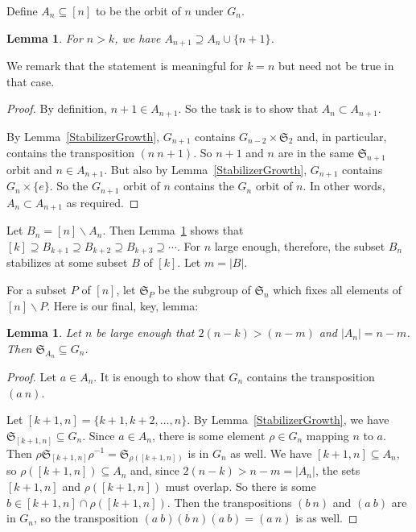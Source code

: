 \documentclass[10pt]{amsart}
\newcommand{\Sn}{\mathfrak{S}}
\newtheorem{lemma}[theorem]{Lemma}
\theoremstyle{definition}
\begin{document}
Define $A_n \subseteq [n]$ to be the orbit of $n$ under $G_n$. 

\begin{lemma} \label{AGrows}
For $n > k$, we have $A_{n+1} \supseteq A_n \cup \{ n+1 \}$.
\end{lemma}

We remark that the statement is meaningful for $k=n$ but need not be true in that case.

\begin{proof}
By definition, $n+1 \in A_{n+1}$. So the task is to show that $A_n \subset A_{n+1}$.

By Lemma~\ref{StabilizerGrowth}, $G_{n+1}$ contains $G_{n-2} \times \Sn_2$ and, in particular, contains the transposition $(n \ n+1)$. So $n+1$ and $n$ are in the same $\Sn_{n+1}$ orbit and $n \in A_{n+1}$. But also by Lemma~\ref{StabilizerGrowth}, $G_{n+1}$ contains $G_n \times \{ e \}$. So the $G_{n+1}$ orbit of $n$ contains the $G_n$ orbit of $n$. In other words, $A_n \subset A_{n+1}$ as required.
\end{proof}

Let $B_n = [n] \backslash A_n$. Then Lemma~\ref{AGrows} shows that $[k] \supseteq B_{k+1} \supseteq B_{k+2} \supseteq B_{k+3} \supseteq \cdots$.
For $n$ large enough, therefore, the subset $B_n$ stabilizes at some subset $B$ of $[k]$. Let $m = |B|$. 

For a subset $P$ of $[n]$, let $\Sn_P$ be the subgroup of $\Sn_n$ which fixes all elements of $[n] \backslash P$.
Here is our final, key, lemma:


\begin{lemma} \label{KeyLemma}
Let $n$ be large enough that $2(n-k) > (n-m)$ and $|A_n| = n-m$. Then $\Sn_{A_n} \subseteq G_n$.
\end{lemma}

\begin{proof}
Let $a \in A_n$. It is enough to show that $G_n$ contains the transposition $(a\ n)$.

Let $[k+1, n] = \{ k+1, k+2, \ldots, n \}$. By Lemma~\ref{StabilizerGrowth}, we have $\Sn_{[k+1, n]} \subseteq G_n$.
Since $a \in A_n$, there is some element $\rho \in G_n$ mapping $n$ to $a$. Then $\rho \Sn_{[k+1, n ]} \rho^{-1} = \Sn_{\rho([k+1, n])}$ is in $G_n$ as well.
We have $[k+1, n] \subseteq A_n$, so $\rho([k+1, n]) \subseteq A_n$ and, since $2(n-k) > n-m = |A_n|$, the sets $[k+1, n]$ and $\rho([k+1, n])$ must overlap. So there is some $b \in [k+1, n] \cap \rho([k+1, n])$. Then the transpositions $(b \ n)$ and $(a \ b)$ are in $G_n$, so the transposition $(a\ b) (b \ n) (a\ b) = (a \ n)$ is as well.
\end{proof}
\end{document}
